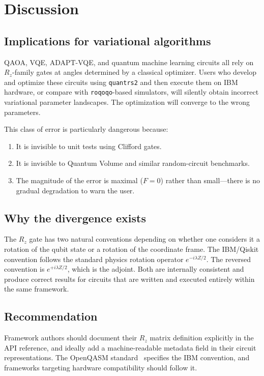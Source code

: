\documentclass[11pt,a4paper]{article}
\begin{document}
\section{Discussion}

\subsection{Implications for variational algorithms}

QAOA, VQE, ADAPT-VQE, and quantum machine learning circuits all rely on
$R_z$-family gates at angles determined by a classical optimizer. Users who
develop and optimize these circuits using \texttt{quantrs2} and then execute
them on IBM hardware, or compare with \texttt{roqoqo}-based simulators, will
silently obtain incorrect variational parameter landscapes. The optimization
will converge to the wrong parameters.

This class of error is particularly dangerous because:
\begin{enumerate}
  \item It is invisible to unit tests using Clifford gates.
  \item It is invisible to Quantum Volume and similar random-circuit benchmarks.
  \item The magnitude of the error is maximal ($F=0$) rather than small---there is no gradual degradation to warn the user.
\end{enumerate}

\subsection{Why the divergence exists}

The $R_z$ gate has two natural conventions depending on whether one considers
it a rotation of the qubit state or a rotation of the coordinate frame. The
IBM/Qiskit convention follows the standard physics rotation operator
$e^{-i\lambda Z/2}$. The reversed convention is $e^{+i\lambda Z/2}$, which is
the adjoint. Both are internally consistent and produce correct results for
circuits that are written and executed entirely within the same framework.

\subsection{Recommendation}

Framework authors should document their $R_z$ matrix definition explicitly in
the API reference, and ideally add a machine-readable metadata field in their
circuit representations. The OpenQASM standard~\cite{cross2022openqasm3}
specifies the IBM convention, and frameworks targeting hardware compatibility
should follow it.
\end{document}
